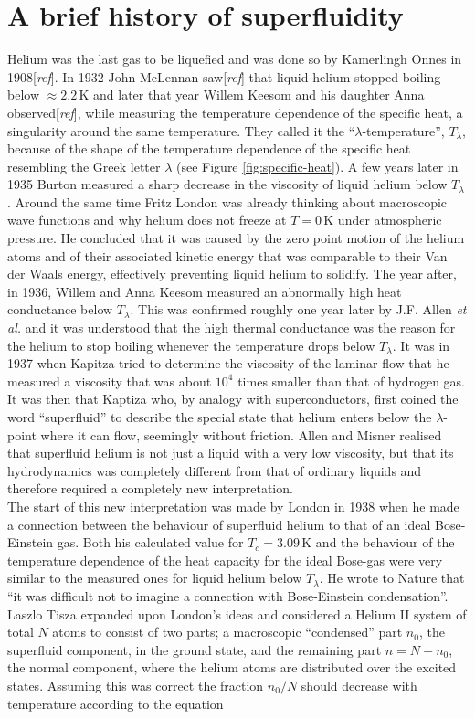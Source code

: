 \documentclass[11pt,a4paper,twoside]{article}
\newcommand{\unit}[1]{\,\mathrm{#1}}
\begin{document}
	\section{A brief history of superfluidity}
		Helium was the last gas to be liquefied and was done so by Kamerlingh Onnes in 1908[\emph{ref}]. In 1932 John McLennan saw[\emph{ref}] that liquid helium stopped boiling below $\approx\!2.2\unit{K}$ and later that year Willem Keesom and his daughter Anna observed[\emph{ref}], while measuring  the temperature dependence of the specific heat, a singularity around the same temperature. They called it the ``$\lambda$-temperature'',  $T_\lambda$, because of the shape of the temperature dependence of the specific heat resembling the Greek letter $\lambda$ (see Figure \ref{fig:specific-heat}). A few years later in 1935 Burton measured a sharp decrease in the viscosity of liquid helium below $T_\lambda$. Around the same time Fritz London was already thinking about macroscopic wave functions and why helium does not freeze at $T=0\unit{K}$ under atmospheric pressure. He concluded that it was caused by the zero point motion of the helium atoms and of their associated kinetic energy that was comparable to their Van der Waals energy, effectively preventing liquid helium to solidify. The year after, in 1936, Willem and Anna Keesom measured an abnormally high heat conductance below $T_\lambda$. This was confirmed roughly one year later by J.F. Allen \emph{et al.} and it was understood that the high thermal conductance was the reason for the helium to stop boiling whenever the temperature drops below $T_\lambda$. It was in 1937 when Kapitza tried to determine the viscosity of the laminar flow that he measured a viscosity that was about $10^4$ times smaller than that of hydrogen gas. It was then that Kaptiza who, by analogy with superconductors, first coined the word ``superfluid'' to describe the special state that helium enters below the $\lambda$-point where it can flow, seemingly without friction. Allen and Misner realised that superfluid helium is not just a liquid with a very low viscosity, but that its hydrodynamics was completely different from that of ordinary liquids and therefore required a completely new interpretation.\\
		
		The start of this new interpretation was made by London in 1938 when he made a connection between the behaviour of superfluid helium to that of an ideal Bose-Einstein gas. Both his calculated value for $T_c=3.09\unit{K}$ and the behaviour of the temperature dependence of the heat capacity for the ideal Bose-gas were very similar to the measured ones for liquid helium below $T_\lambda$. He wrote to Nature that ``it was difficult not to imagine a connection with Bose-Einstein condensation''. Laszlo Tisza expanded upon London's ideas and considered a Helium II system of total $N$ atoms to consist of two parts; a macroscopic ``condensed'' part $n_0$, the superfluid component, in the ground state, and the remaining part $n=N-n_0$, the normal component, where the helium atoms are distributed over the excited states. Assuming this was correct the fraction $n_0/N$ should decrease with temperature according to the equation\\
\end{document}
